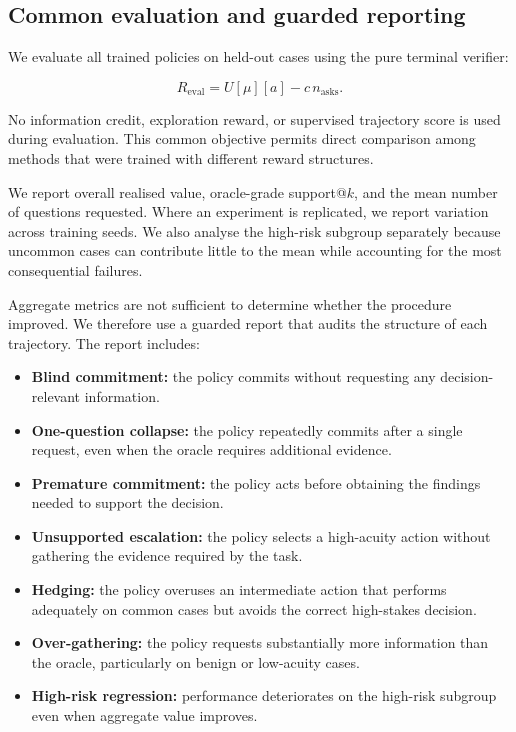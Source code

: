 \documentclass{article}
\begin{document}
\subsection{Common evaluation and guarded reporting}
\label{subsec:evaluation}

We evaluate all trained policies on held-out cases using the pure terminal verifier:

\[
R_{\text{eval}}
=
U[\mu][a] - c\,n_{\text{asks}}.
\]

No information credit, exploration reward, or supervised trajectory score is used
during evaluation. This common objective permits direct comparison among methods
that were trained with different reward structures.

We report overall realised value, oracle-grade support@$k$, and the mean number of
questions requested. Where an experiment is replicated, we report variation across
training seeds. We also analyse the high-risk subgroup separately because uncommon
cases can contribute little to the mean while accounting for the most consequential
failures.

Aggregate metrics are not sufficient to determine whether the procedure improved.
We therefore use a guarded report that audits the structure of each trajectory. The
report includes:

\begin{itemize}
    \item \textbf{Blind commitment:} the policy commits without requesting any
    decision-relevant information.

    \item \textbf{One-question collapse:} the policy repeatedly commits after a
    single request, even when the oracle requires additional evidence.

    \item \textbf{Premature commitment:} the policy acts before obtaining the
    findings needed to support the decision.

    \item \textbf{Unsupported escalation:} the policy selects a high-acuity action
    without gathering the evidence required by the task.

    \item \textbf{Hedging:} the policy overuses an intermediate action that performs
    adequately on common cases but avoids the correct high-stakes decision.

    \item \textbf{Over-gathering:} the policy requests substantially more
    information than the oracle, particularly on benign or low-acuity cases.

    \item \textbf{High-risk regression:} performance deteriorates on the high-risk
    subgroup even when aggregate value improves.
\end{itemize}
\end{document}
